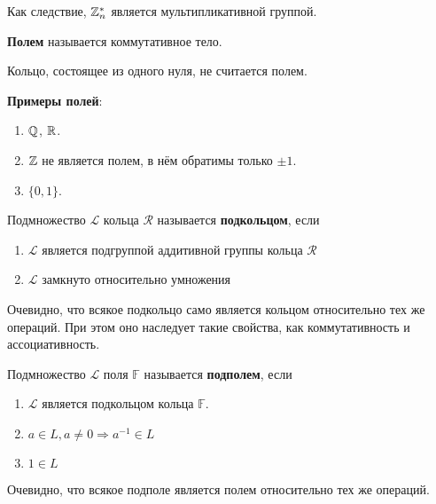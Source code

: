 \begin{remark}
    Как следствие, $\mathbb{Z}_n^\ast$ является мультипликативной группой.
\end{remark}

\begin{definition}
    \textbf{Полем} называется коммутативное тело.
\end{definition}

\begin{remark}
    Кольцо, состоящее из одного нуля, не считается полем.
\end{remark}

\textbf{Примеры полей}:
\begin{enumerate}[nolistsep]
    \item $\mathbb{Q}$, $\mathbb{R}$.
    \item $\mathbb{Z}$ не является полем, в нём обратимы только $\pm 1$.
    \item $\{0, 1\}$.
\end{enumerate}

\begin{definition}
    Подмножество $\mathcal{L}$ кольца $\mathcal{R}$ называется \textbf{подкольцом}, если
    \begin{enumerate}[nolistsep]
        \item $\mathcal{L}$ является подгруппой аддитивной группы кольца $\mathcal{R}$
        \item $\mathcal{L}$ замкнуто относительно умножения
    \end{enumerate}
\end{definition}

Очевидно, что всякое подкольцо само является кольцом относительно тех же операций. При этом оно наследует такие свойства, как коммутативность и ассоциативность.

\begin{definition}
    Подмножество $\mathcal{L}$ поля $\mathbb{F}$ называется \textbf{подполем}, если
    \begin{enumerate}[nolistsep]
        \item $\mathcal{L}$ является подкольцом кольца $\mathbb{F}$.
        \item $a \in L, a \ne 0 \Rightarrow a^{-1} \in L$
        \item $1 \in L$
    \end{enumerate}
\end{definition}

Очевидно, что всякое подполе является полем относительно тех же операций.

